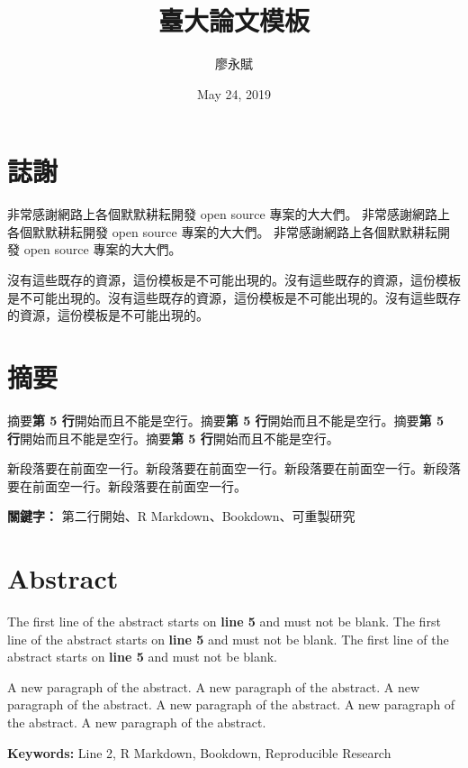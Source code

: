 \documentclass[oneside]{book}
\title{臺大論文模板}
\author{廖永賦}
\date{May 24, 2019}
\begin{document}


\clearpage
{}

{}



\chapter*{誌謝}
非常感謝網路上各個默默耕耘開發 open source 專案的大大們。
非常感謝網路上各個默默耕耘開發 open source 專案的大大們。
非常感謝網路上各個默默耕耘開發 open source 專案的大大們。

沒有這些既存的資源，這份模板是不可能出現的。沒有這些既存的資源，這份模板是不可能出現的。沒有這些既存的資源，這份模板是不可能出現的。沒有這些既存的資源，這份模板是不可能出現的。


\chapter*{摘要}
摘要\textbf{第 5 行}開始而且不能是空行。摘要\textbf{第 5 行}開始而且不能是空行。摘要\textbf{第 5 行}開始而且不能是空行。摘要\textbf{第 5 行}開始而且不能是空行。

新段落要在前面空一行。新段落要在前面空一行。新段落要在前面空一行。新段落要在前面空一行。新段落要在前面空一行。
\bigbreak

\noindent
\textbf{關鍵字：} 第二行開始、R Markdown、Bookdown、可重製研究

\chapter*{Abstract}
The first line of the abstract starts on \textbf{line 5} and must not be blank. The first line of the abstract starts on \textbf{line 5} and must not be blank. The first line of the abstract starts on \textbf{line 5} and must not be blank.

A new paragraph of the abstract. A new paragraph of the abstract. A new paragraph of the abstract. A new paragraph of the abstract. A new paragraph of the abstract. A new paragraph of the abstract.
\bigbreak

\noindent
\textbf{Keywords:} Line 2, R Markdown, Bookdown, Reproducible Research
\end{document}
